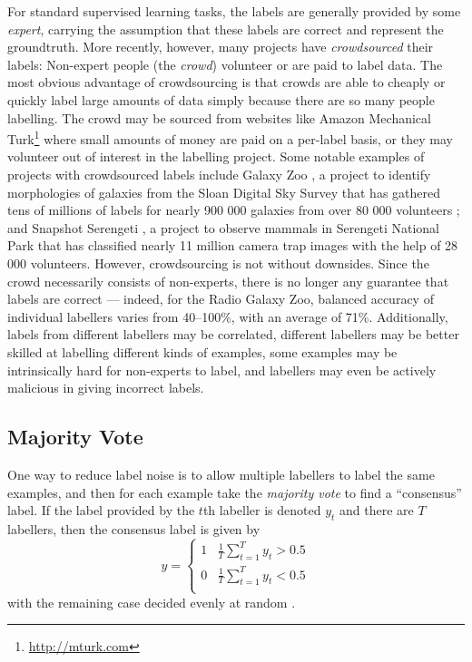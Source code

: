         For standard supervised learning tasks, the labels are generally
        provided by some \emph{expert}, carrying the assumption that these
        labels are correct and represent the groundtruth. More recently,
        however, many projects have
        \emph{crowdsourced} their labels: Non-expert people (the \emph{crowd})
        volunteer or are paid to label data. The most obvious advantage of
        crowdsourcing is that crowds are able to cheaply or quickly label large
        amounts of data simply because there are so many people labelling. The
        crowd may be sourced from websites like Amazon Mechanical
        Turk\footnote{\url{http://mturk.com}} where small amounts of money are
        paid on a per-label basis, or they may volunteer out of interest in the
        labelling project. Some notable examples of projects with crowdsourced
        labels include Galaxy Zoo \citep{lintott08}, a project to identify
        morphologies of galaxies from the Sloan Digital Sky Survey that has
        gathered tens of millions of labels for nearly 900 000 galaxies from
        over 80 000 volunteers
        \citep{lintott11}; and Snapshot Serengeti \citep{swanson15}, a project to
        observe mammals in Serengeti National Park that has classified nearly
        11 million camera trap images with the help of 28 000 volunteers.
        However, crowdsourcing is not without downsides. Since the crowd
        necessarily consists of non-experts, there is no longer any guarantee
        that labels are correct --- indeed, for the Radio Galaxy Zoo, balanced
        accuracy of individual labellers varies from 40--100\%, with an average
        of 71\%. Additionally, labels from different labellers may be
        correlated, different labellers may be better skilled at labelling
        different kinds of examples, some examples may be intrinsically hard
        for non-experts to label, and labellers may even be actively malicious
        in giving incorrect labels.

    \subsection{Majority Vote}

        One way to reduce label noise is to allow multiple labellers to label the same examples, and then for each example take the \emph{majority vote} to find a ``consensus'' label. If the label provided by the $t$th labeller is denoted $y_t$ and there are $T$ labellers, then the consensus label is given by
        \begin{equation*}
            y = \begin{cases}
                1 & \frac{1}{T} \sum_{t = 1}^T y_t > 0.5\\
                0 & \frac{1}{T} \sum_{t = 1}^T y_t < 0.5\\
            \end{cases}
        \end{equation*}
        with the remaining case decided evenly at random \citep{raykar10}.

